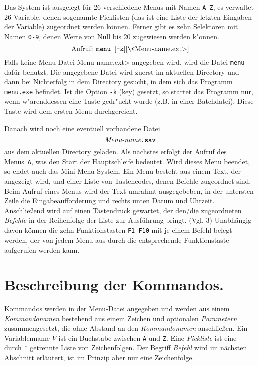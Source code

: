 Das System ist ausgelegt f\"ur 26 verschiedene Menus mit Namen 
{\tt A-Z}, es verwaltet 26
Variable, denen sogenannte Picklisten (das ist eine Liste der 
letzten Eingaben der Variable) zugeordnet werden k\"onnen.
Ferner gibt es zehn Selektoren mit Namen {\tt 0-9}, denen Werte von Null
bis 20 zugewiesen werden k"onnen.
$$
   \hbox{Aufruf: {\tt menu $[$-k$]$}[\<Menu-name.ext>]}
$$
Falls keine Menu-Datei \<Menu-name.ext> angegeben wird,
wird die Datei
{\tt menu} daf\"ur benutzt. Die angegebene Datei wird zuerst
im aktuellen Directory und dann bei Nichterfolg in dem Directory
gesucht, in dem sich das Programm {\tt menu.exe} befindet.
Ist die Option {\tt -k} (key) gesetzt, so startet das Programm nur,
wenn w"arenddessen eine Taste gedr"uckt wurde (z.B. in einer Batchdatei).
Diese Taste wird dem ersten Menu durchgereicht.

Danach wird noch eine eventuell vorhandene Datei
$$\hbox{{\it Menu-name}{\tt .sav}}$$
aus dem aktuellen Directory geladen.
Als n\"achstes erfolgt der Aufruf des
Menus~{\tt A}, was den Start der Hauptschleife bedeutet. Wird dieses
Menu beendet, so endet auch das Mini-Menu-System.
Ein Menu besteht aus einem Text, der angezeigt wird, und einer Liste
von Tastencodes, denen Befehle zugeordnet sind. Beim Aufruf eines 
Menus wird der Text umrahmt ausgegebeben, in der untersten Zeile
die Eingabeauf{}forderung und rechts unten Datum und Uhrzeit.
Anschlie\ss end wird auf einen Tastendruck gewartet, der den/die 
zugeordneten {\it Befehle} in der Reihenfolge der Liste zur 
Ausf\"uhrung bringt. (Vgl. 3) Unabh\"angig davon k\"onnen die
zehn Funktionstasten {\tt F1-F10} mit je einem Befehl belegt
werden, der von jedem Menu aus durch die entsprechende Funktionstaste
aufgerufen werden kann.

\section{Beschreibung der Kommandos.}

Kommandos werden in der Menu-Datei angegeben und werden aus einem 
{\it Kommandonamen\/} bestehend aus einem Zeichen und optionalen 
{\it Parametern\/} zusammengesetzt, die 
ohne Abstand an den {\it Kommandonamen\/} 
anschlie\ss en. Ein Variablenname $V$ ist ein Buchstabe zwischen
{\tt A} und {\tt Z}. Eine {\it Pickliste\/}
 ist eine durch~$^\circ$ getrennte
Liste von Zeichenfolgen. Der Begriff {\it Befehl\/}
 wird im n\"achsten
Abschnitt erl\"autert, ist im Prinzip aber nur eine Zeichenfolge.



